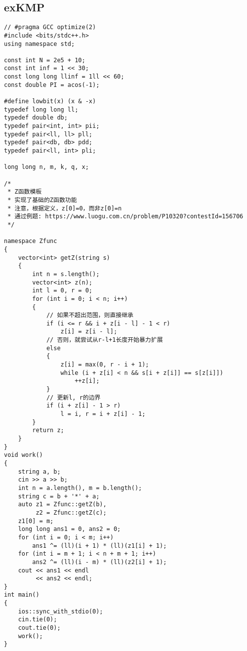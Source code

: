 \documentclass{ctexbook}  %
\begin{document}
\subsection{exKMP}
\lstset{basicstyle=	tfamily}
\begin{Verbatim}[fontsize=\small]
// #pragma GCC optimize(2)
#include <bits/stdc++.h>
using namespace std;

const int N = 2e5 + 10;
const int inf = 1 << 30;
const long long llinf = 1ll << 60;
const double PI = acos(-1);

#define lowbit(x) (x & -x)
typedef long long ll;
typedef double db;
typedef pair<int, int> pii;
typedef pair<ll, ll> pll;
typedef pair<db, db> pdd;
typedef pair<ll, int> pli;

long long n, m, k, q, x;

/*
 * Z函数模板
 * 实现了基础的Z函数功能
 * 注意，根据定义，z[0]=0，而非z[0]=n
 * 通过例题: https://www.luogu.com.cn/problem/P10320?contestId=156706
 */

namespace Zfunc
{
    vector<int> getZ(string s)
    {
        int n = s.length();
        vector<int> z(n);
        int l = 0, r = 0;
        for (int i = 0; i < n; i++)
        {
            // 如果不超出范围，则直接继承
            if (i <= r && i + z[i - l] - 1 < r)
                z[i] = z[i - l];
            // 否则，就尝试从r-l+1长度开始暴力扩展
            else
            {
                z[i] = max(0, r - i + 1);
                while (i + z[i] < n && s[i + z[i]] == s[z[i]])
                    ++z[i];
            }
            // 更新l, r的边界
            if (i + z[i] - 1 > r)
                l = i, r = i + z[i] - 1;
        }
        return z;
    }
}
void work()
{
    string a, b;
    cin >> a >> b;
    int n = a.length(), m = b.length();
    string c = b + '*' + a;
    auto z1 = Zfunc::getZ(b),
         z2 = Zfunc::getZ(c);
    z1[0] = m;
    long long ans1 = 0, ans2 = 0;
    for (int i = 0; i < m; i++)
        ans1 ^= (ll)(i + 1) * (ll)(z1[i] + 1);
    for (int i = m + 1; i < n + m + 1; i++)
        ans2 ^= (ll)(i - m) * (ll)(z2[i] + 1);
    cout << ans1 << endl
         << ans2 << endl;
}
int main()
{
    ios::sync_with_stdio(0);
    cin.tie(0);
    cout.tie(0);
    work();
}
\end{Verbatim}
\end{document}
